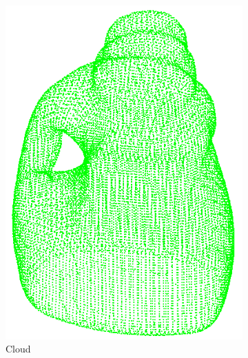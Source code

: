 \begin{figure}[!t]
\begin{subfigure}{0.3\linewidth}
    \includegraphics[width=0.9\linewidth]{Figures/ObjRecog/detergent_cloud.png}
    \caption{Cloud}
    \label{fig:objrecog:meshcloudgrid:cloud}
  \end{subfigure}
  \begin{subfigure}{0.3\linewidth}
    \centering

\end{subfigure}
\end{figure}
